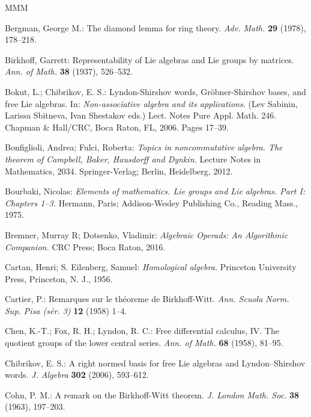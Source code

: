 \documentclass[11pt,a4paper]{amsart}
\newcommand{\gbibitem}[1]{ \bibitem{#1}}
\newcommand{\snewpage}{}
\newcommand{\gbibitem}[1]{ \bibitem{#1}\rlap{\smash{${}^{^{[#1]}}$}}}
\newcommand{\snewpage}{\newpage}
\newcommand{\gbibitem}[1]{ \bibitem{#1}}
\newcommand{\snewpage}{}
\theoremstyle{definition}
\theoremstyle{plain}
\begin{document}
\snewpage
\begin{thebibliography}{MMM}



\gbibitem{Ber}
Bergman, George M.:
The diamond lemma for ring theory.
\textit{Adv. Math.} \textbf{29} (1978), 178--218.


\gbibitem{B}
Birkhoff, Garrett:
Representability of Lie algebras and Lie groups by matrices.
\textit{Ann. of Math. } \textbf{38}  (1937),  526--532.



\gbibitem{BCh}
Bokut,  L.; Chibrikov, E. S.:
Lyndon-Shirshov words, Gröbner-Shirshov bases, and free Lie algebras.
In: \textit{Non-associative algebra and its applications.}
(Lev Sabinin, Larissa Sbitneva, Ivan Shestakov eds.)
Lect. Notes Pure Appl. Math. 246.
Chapman \& Hall/CRC, Boca Raton, FL, 2006. Pages 17--39.


\gbibitem{BF}
Bonfiglioli, Andrea; Fulci, Roberta:
\textit{Topics in noncommutative algebra. The theorem of Campbell, Baker, Hausdorff and Dynkin.}
Lecture Notes in Mathematics, 2034.
Springer-Verlag; Berlin, Heidelberg, 2012.

\gbibitem{BX}
Bourbaki, Nicolas:
\textit{Elements of mathematics. Lie groups and Lie algebras. Part I: Chapters 1--3.}
Hermann, Paris; Addison-Wesley Publishing Co., Reading Mass., 1975.

\gbibitem{BD}
Bremner, Murray R; Dotsenko, Vladimir:
\textit{Algebraic Operads: An Algorithmic Companion.}
CRC Press; Boca Raton, 2016.

\gbibitem{CE}
Cartan, Henri; S. Eilenberg, Samuel:
\textit{Homological algebra.}
Princeton University Press, Princeton, N. J., 1956.




\gbibitem{C}
Cartier, P.:
Remarques sur le th\'eoreme de Birkhoff-Witt.
\textit{Ann. Scuola Norm. Sup. Pisa (s\'er. 3)}  \textbf{12}  (1958) 1--4.




\gbibitem{CFL}
Chen, K.-T.; Fox, R. H.; Lyndon, R. C.:
Free differential calculus, IV. The quotient groups of the lower central series.
\textit{Ann. of Math.}  \textbf{68}  (1958), 81--95.


\gbibitem{Chb}
Chibrikov, E. S.:
A right normed basis for free Lie algebras and Lyndon–Shirshov
words. \textit{J. Algebra} \textbf{302}  (2006), 593--612.


\gbibitem{CC}
Cohn, P. M.:
A remark on the Birkhoff-Witt theorem.
\textit{J. London Math. Soc.}  \textbf{38}  (1963), 197--203.


\end{thebibliography}
\end{document}
